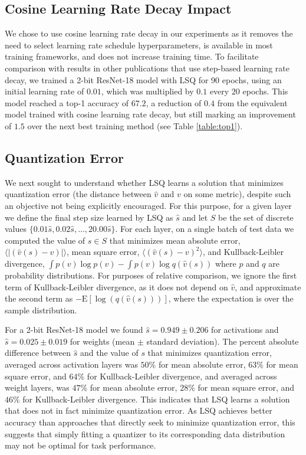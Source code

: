 \documentclass{article}
\begin{document}
\subsection{Cosine Learning Rate Decay Impact}

We chose to use cosine learning rate decay in our experiments as it removes the need to select learning rate schedule hyperparameters, is available in most training frameworks, and does not increase training time.
%
To facilitate comparison with results in other publications that use step-based learning rate decay, we trained a 2-bit ResNet-18 model with LSQ for 90 epochs, using an initial learning rate of $0.01$, which was multiplied by $0.1$ every $20$ epochs.
%
This model reached a top-1 accuracy of $67.2$, a reduction of $0.4$ from the equivalent model trained with cosine learning rate decay, but still marking an improvement of $1.5$ over the next best training method (see Table \ref{table:top1}).


\subsection{Quantization Error}
\label{sec:qe}

We next sought to understand whether LSQ learns a solution that minimizes quantization error (the distance between $\hat{v}$ and $v$ on some metric), despite such an objective not being explicitly encouraged.
%
For this purpose, for a given layer we define the final step size learned by LSQ as $\hat{s}$ and let $S$ be the set of discrete values $\{0.01\hat{s}, 0.02\hat{s}, ..., 20.00\hat{s}\}$.
%
For each layer, on a single batch of test data we computed the value of $s \in S$ that minimizes
mean absolute error, $\langle |(\hat{v}(s) - v)| \rangle$,
mean square error, $\langle (\hat{v}(s) - v)^2 \rangle$,
and Kullback-Leibler divergence, $\int p(v) \log p(v) - \int p(v) \log q(\hat{v}(s))$ where $p$ and $q$ are probability distributions.
%
For purposes of relative comparison, we ignore the first term of Kullback-Leibler divergence, as it does not depend on $\hat{v}$, and approximate the second term as $ - \text{E}[ \log(q(\hat{v}(s)))]$, where the expectation is over the sample distribution.
%

For a 2-bit ResNet-18 model we found $\hat{s}=0.949 \pm 0.206$ for activations and $\hat{s}=0.025 \pm 0.019$ for weights (mean $\pm$ standard deviation).
%
The percent absolute difference between $\hat{s}$ and the value of $s$ that minimizes quantization error, averaged across activation layers was $50\%$ for mean absolute error, $63\%$ for mean square error, and $64\%$ for Kullback-Leibler divergence,
%
and averaged across weight layers, was $47\%$ for  mean absolute error, $28\%$ for mean square error, and $46\%$ for Kullback-Leibler divergence.
%
This indicates that LSQ learns a solution that does not in fact minimize quantization error.
%
As LSQ achieves better accuracy than approaches that directly seek to minimize quantization error, this suggests that simply fitting a quantizer to its corresponding data distribution may not be optimal for task performance.
\end{document}
